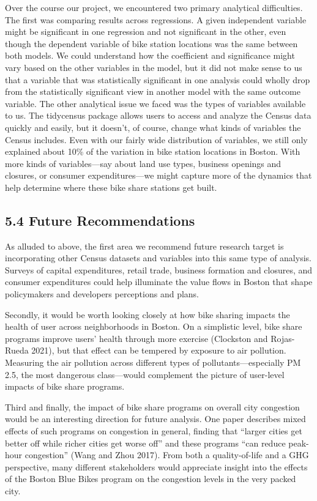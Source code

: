 \documentclass[
  12pt,
]{article}
\begin{document}
Over the course our project, we encountered two primary analytical
difficulties. The first was comparing results across regressions. A
given independent variable might be significant in one regression and
not significant in the other, even though the dependent variable of bike
station locations was the same between both models. We could understand
how the coefficient and significance might vary based on the other
variables in the model, but it did not make sense to us that a variable
that was statistically significant in one analysis could wholly drop
from the statistically significant view in another model with the same
outcome variable. The other analytical issue we faced was the types of
variables available to us. The tidycensus package allows users to access
and analyze the Census data quickly and easily, but it doesn't, of
course, change what kinds of variables the Census includes. Even with
our fairly wide distribution of variables, we still only explained about
10\% of the variation in bike station locations in Boston. With more
kinds of variables---say about land use types, business openings and
closures, or consumer expenditures---we might capture more of the
dynamics that help determine where these bike share stations get built.

\hypertarget{future-recommendations}{%
\subsection{5.4 Future Recommendations}\label{future-recommendations}}

As alluded to above, the first area we recommend future research target
is incorporating other Census datasets and variables into this same type
of analysis. Surveys of capital expenditures, retail trade, business
formation and closures, and consumer expenditures could help illuminate
the value flows in Boston that shape policymakers and developers
perceptions and plans.

Secondly, it would be worth looking closely at how bike sharing impacts
the health of user across neighborhoods in Boston. On a simplistic
level, bike share programs improve users' health through more exercise
(Clockston and Rojas-Rueda 2021), but that effect can be tempered by
exposure to air pollution. Measuring the air pollution across different
types of pollutants---especially PM 2.5, the most dangerous
class---would complement the picture of user-level impacts of bike share
programs.

Third and finally, the impact of bike share programs on overall city
congestion would be an interesting direction for future analysis. One
paper describes mixed effects of such programs on congestion in general,
finding that ``larger cities get better off while richer cities get
worse off'' and these programs ``can reduce peak-hour congestion'' (Wang
and Zhou 2017). From both a quality-of-life and a GHG perspective, many
different stakeholders would appreciate insight into the effects of the
Boston Blue Bikes program on the congestion levels in the very packed
city.
\end{document}
